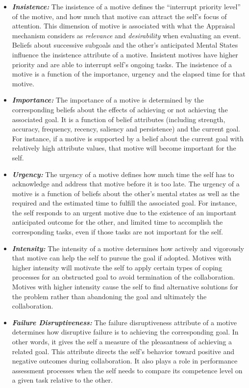 \documentclass[letterpaper]{article}
\begin{document}
\begin{itemize}
  \item \textbf{\textit{Insistence:}} The insistence of a motive defines the
  ``interrupt priority level'' of the motive, and how much that motive can
  attract the self's focus of attention. This dimension of motive is associated
  with what the Appraisal mechanism considers as \emph{relevance} and
  \emph{desirability} when evaluating an event. Beliefs about successive
  subgoals and the other's anticipated Mental States influence the insistence
  attribute of a motive. Insistent motives have higher priority and are able to
  interrupt self's ongoing tasks. The insistence of a motive is a function of
  the importance, urgency and the elapsed time for that motive.
  
  \item \textbf{\textit{Importance:}} The importance of a motive is determined
  by the corresponding beliefs about the effects of achieving or not achieving
  the associated goal. It is a function of belief attributes (including
  strength, accuracy, frequency, recency, saliency and persistence) and the
  current goal. For instance, if a motive is supported by a belief about the
  current goal with relatively high attribute values, that motive will become
  important for the self.
  
  \item \textbf{\textit{Urgency:}} The urgency of a motive defines how much time
  the self has to acknowledge and address that motive before it is too late.
  The urgency of a motive is a function of beliefs about the other's mental
  states as well as the required and the estimated time to fulfill the
  associated goal. For instance, the self responds to an urgent motive due to
  the existence of an important anticipated outcome for the other, and limited
  time to accomplish the corresponding tasks, even if those tasks are not
  important for the self.
  
  \item \textbf{\textit{Intensity:}} The intensity of a motive determines how
  actively and vigorously that motive can help the self to pursue the goal if
  adopted. Motives with higher intensity will motivate the self to apply
  certain types of coping processes for an obstructed goal to avoid termination
  of the collaboration. Motives with higher intensity cause the self to find
  alternative solutions for the problem rather than abandoning the goal and
  ultimately the collaboration.
  
  \item \textbf{\textit{Failure Disruptiveness:}} The failure disruptiveness
  attribute of a motive determines how disruptive failure is to achieving the
  corresponding goal. In other words, it gives the self a measure of the
  pleasantness of achieving a related goal. This attribute directs the self's
  behavior toward positive and negative outcomes during collaboration. It also
  plays a role in performance assessment processes when the self needs to
  compare its competence level on a given task relative to the other.
\end{itemize}
\end{document}
